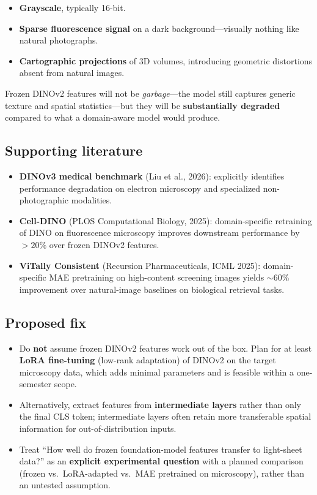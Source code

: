 \documentclass{article}
\begin{document}
\begin{itemize}
	\item \textbf{Grayscale}, typically 16-bit.
	\item \textbf{Sparse fluorescence signal} on a dark background---visually
	      nothing like natural photographs.
	\item \textbf{Cartographic projections} of 3D volumes, introducing geometric
	      distortions absent from natural images.
\end{itemize}

\noindent Frozen DINOv2 features will not be \emph{garbage}---the model still
captures generic texture and spatial statistics---but they will be
\textbf{substantially degraded} compared to what a domain-aware model would
produce.

\subsection*{Supporting literature}

\begin{itemize}
	\item \textbf{DINOv3 medical benchmark} (Liu et al., 2026): explicitly
	      identifies performance degradation on electron microscopy and
	      specialized non-photographic modalities.
	\item \textbf{Cell-DINO} (PLOS Computational Biology, 2025): domain-specific
	      retraining of DINO on fluorescence microscopy improves downstream
	      performance by $>20\%$ over frozen DINOv2 features.
	\item \textbf{ViTally Consistent} (Recursion Pharmaceuticals, ICML 2025):
	      domain-specific MAE pretraining on high-content screening images yields
	      $\sim$60\% improvement over natural-image baselines on biological
	      retrieval tasks.
\end{itemize}

\subsection*{Proposed fix}

\begin{itemize}
	\item Do \textbf{not} assume frozen DINOv2 features work out of the box.
	      Plan for at least \textbf{LoRA fine-tuning} (low-rank adaptation) of
	      DINOv2 on the target microscopy data, which adds minimal parameters
	      and is feasible within a one-semester scope.
	\item Alternatively, extract features from \textbf{intermediate layers}
	      rather than only the final CLS token; intermediate layers often retain
	      more transferable spatial information for out-of-distribution inputs.
	\item Treat ``How well do frozen foundation-model features transfer to
	      light-sheet data?'' as an \textbf{explicit experimental question}
	      with a planned comparison (frozen vs.\ LoRA-adapted vs.\ MAE
	      pretrained on microscopy), rather than an untested assumption.
\end{itemize}
\end{document}
